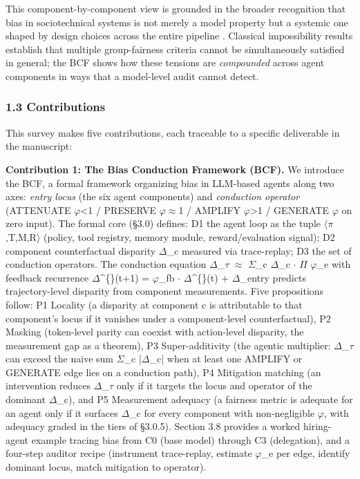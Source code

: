\documentclass[10pt]{article}
\begin{document}
This component-by-component view is grounded in the broader recognition that bias in sociotechnical systems is not merely a model property but a systemic one shaped by design choices across the entire pipeline \cite{selbst2019fairness,blodgett2020language}. Classical impossibility results \cite{kleinberg2017inherent,chouldechova2017fair} establish that multiple group-fairness criteria cannot be simultaneously satisfied in general; the BCF shows how these tensions are \emph{compounded} across agent components in ways that a model-level audit cannot detect.

\subsubsection*{1.3 Contributions}

This survey makes five contributions, each traceable to a specific deliverable in the manuscript:

\textbf{Contribution 1: The Bias Conduction Framework (BCF).} We introduce the BCF, a formal framework organizing bias in LLM-based agents along two axes: \emph{entry locus} (the six agent components) and \emph{conduction operator} (ATTENUATE $\varphi$<1 / PRESERVE $\varphi$$\approx$1 / AMPLIFY $\varphi$>1 / GENERATE $\varphi$ on zero input). The formal core (\S{}3.0) defines: D1 the agent loop as the tuple $\langle$$\pi$,T,M,R$\rangle$ (policy, tool registry, memory module, reward/evaluation signal); D2 component counterfactual disparity $\Delta$\_c measured via trace-replay; D3 the set of conduction operators. The conduction equation $\Delta$\_$\tau$ $\approx$ $\Sigma$\_c $\Delta$\_c $\cdot$ $\Pi$ $\varphi$\_e with feedback recurrence $\Delta$\textasciicircum\{\}(t+1) = $\varphi$\_fb $\cdot$ $\Delta$\textasciicircum\{\}(t) + $\Delta$\_entry predicts trajectory-level disparity from component measurements. Five propositions follow: P1 Locality (a disparity at component c is attributable to that component's locus if it vanishes under a component-level counterfactual), P2 Masking (token-level parity can coexist with action-level disparity, the measurement gap as a theorem), P3 Super-additivity (the agentic multiplier: $\Delta$\_$\tau$ can exceed the naive sum $\Sigma$\_c |$\Delta$\_c| when at least one AMPLIFY or GENERATE edge lies on a conduction path), P4 Mitigation matching (an intervention reduces $\Delta$\_$\tau$ only if it targets the locus and operator of the dominant $\Delta$\_c), and P5 Measurement adequacy (a fairness metric is adequate for an agent only if it surfaces $\Delta$\_c for every component with non-negligible $\varphi$, with adequacy graded in the tiers of \S{}3.0.5). Section 3.8 provides a worked hiring-agent example tracing bias from C0 (base model) through C3 (delegation), and a four-step auditor recipe (instrument trace-replay, estimate $\varphi$\_e per edge, identify dominant locus, match mitigation to operator).
\end{document}
